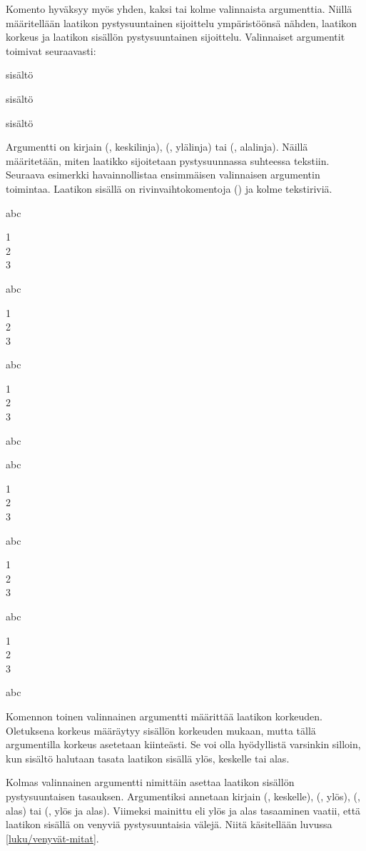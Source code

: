 Komento  hyväksyy myös yhden, kaksi tai kolme
valinnaista argumenttia. Niillä määritellään laatikon pystysuuntainen
sijoittelu ympäristöönsä nähden, laatikon korkeus ja laatikon sisällön
pystysuuntainen sijoittelu. Valinnaiset argumentit toimivat seuraavasti:

\begin{koodilohkosis}
\parbox[sijainti]{leveys}{sisältö}
\parbox[sijainti][korkeus]{leveys}{sisältö}
\parbox[sijainti][korkeus][sisäsijainti]{leveys}{sisältö}
\end{koodilohkosis}

\noindent
Argumentti  on kirjain  (,
keskilinja),  (, ylälinja) tai 
(, alalinja). Näillä määritetään, miten laatikko
sijoitetaan pystysuunnassa suhteessa tekstiin. Seuraava esimerkki
havainnollistaa ensimmäisen valinnaisen argumentin toimintaa. Laatikon
sisällä on rivinvaihtokomentoja (\komento{\keno}) ja kolme tekstiriviä.

\begin{koodilohkosis}
abc \parbox[c]{1em}{1 \\ 2 \\ 3}
abc \parbox[t]{1em}{1 \\ 2 \\ 3}
abc \parbox[b]{1em}{1 \\ 2 \\ 3} abc
\end{koodilohkosis}

\begin{tulossis}
  abc \parbox[c]{1em}{1 \\ 2 \\ 3}
  abc \parbox[t]{1em}{1 \\ 2 \\ 3}
  abc \parbox[b]{1em}{1 \\ 2 \\ 3} abc
\end{tulossis}

\noindent
Komennon toinen valinnainen argumentti  määrittää
laatikon korkeuden. Oletuksena korkeus määräytyy sisällön korkeuden
mukaan, mutta tällä argumentilla korkeus asetetaan kiinteästi. Se voi
olla hyödyllistä varsinkin silloin, kun sisältö halutaan tasata laatikon
sisällä ylös, keskelle tai alas.

Kolmas valinnainen argumentti  nimittäin asettaa
laatikon sisällön pystysuuntaisen tasauksen. Argumentiksi annetaan
kirjain  (, keskelle), 
(, ylös),  (, alas) tai
 (, ylös ja alas). Viimeksi mainittu eli ylös
ja alas tasaaminen vaatii, että laatikon sisällä on venyviä
pystysuuntaisia välejä. Niitä käsitellään luvussa
\ref{luku/venyvät-mitat}.

